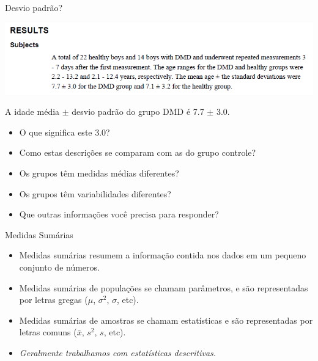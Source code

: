 \documentclass{beamer}
\begin{document}
\begin{frame}{\scriptsize Desvio padrão?}
  \begin{center}
    \includegraphics[width=1\textwidth]{Cap3/DP2}
  \end{center}

  \begin{block}{}
    \footnotesize
    A idade média $\pm$ desvio padrão do grupo DMD é 7.7 $\pm$ 3.0.

    \begin{itemize}
      \footnotesize
    \item O que significa este 3.0?
      \medskip
    \item Como estas descrições se comparam com as do grupo controle?
      \medskip
    \item \alert{Os grupos têm medidas médias diferentes?}
      \medskip
    \item \alert{Os grupos têm variabilidades diferentes?}
      \medskip
    \item Que outras informações você precisa para responder?
    \end{itemize}
  \end{block}
\end{frame}

\begin{frame}{\scriptsize Medidas Sumárias}
  \begin{itemize}
    \footnotesize
  \item<1,4> Medidas sumárias resumem a informação contida nos dados em um
    pequeno conjunto de números.
    \bigskip
  \item<2,3> Medidas sumárias de \alert{populações} se chamam
    \alert{parâmetros}, e são representadas por letras gregas ($\mu$, $\sigma^2$, $\sigma$, etc).
    \bigskip
  \item<3> Medidas sumárias de \alert{amostras} se chamam \alert{estatísticas} e são representadas por letras comuns ($\bar{x}$, $s^2$, $s$, etc).
    \bigskip
  \item<4> {\em Geralmente trabalhamos com estatísticas descritivas.}
  \end{itemize}
\end{frame}
\end{document}
